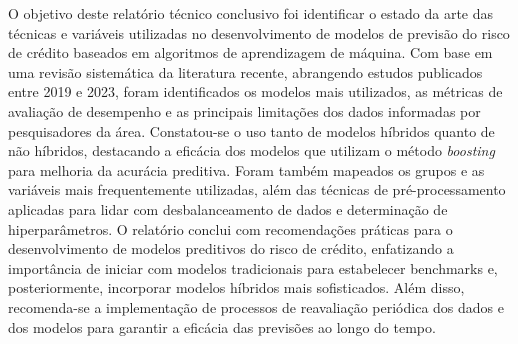 \begin{meuresumo}
O objetivo deste relatório técnico conclusivo foi identificar o estado 
da arte das técnicas e variáveis utilizadas no desenvolvimento de 
modelos de previsão do risco de crédito baseados em algoritmos de 
aprendizagem de máquina. Com base em uma revisão sistemática da 
literatura recente, abrangendo estudos publicados entre 2019 e 2023, 
foram identificados os modelos mais utilizados, as métricas de 
avaliação de desempenho e as principais limitações dos dados 
informadas por pesquisadores da área. Constatou-se o uso tanto 
de modelos híbridos quanto de não híbridos, destacando a eficácia 
dos modelos que utilizam o método \textit{boosting} para melhoria 
da acurácia preditiva. Foram também mapeados os grupos e as variáveis 
mais frequentemente utilizadas, além das técnicas de pré-processamento 
aplicadas para lidar com desbalanceamento de dados e determinação 
de hiperparâmetros. O relatório conclui com recomendações práticas 
para o desenvolvimento de modelos preditivos do risco de crédito, 
enfatizando a importância de iniciar com modelos tradicionais 
para estabelecer benchmarks e, posteriormente, incorporar modelos 
híbridos mais sofisticados. Além disso, recomenda-se a implementação 
de processos de reavaliação periódica dos dados e dos modelos para 
garantir a eficácia das previsões ao longo do tempo.
\end{meuresumo}




\makeatletter
\def\@makechapterhead#1{%
  \vspace*{50\p@}%
  {\parindent \z@ \raggedright \normalfont
    \ifnum \c@secnumdepth >\m@ne
      \huge\bfseries \thechapter\space
    \fi
    \huge \bfseries #1\par\nobreak
    \vskip 40\p@
  }}
\makeatother


